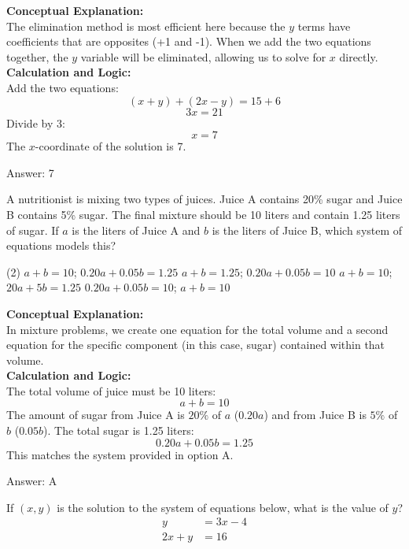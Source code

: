 \documentclass[11pt,paper=a4,answers]{exam}
\begin{document}
\begin{questions}
\begin{solution}
\textbf{Conceptual Explanation:} \\
The elimination method is most efficient here because the $y$ terms have coefficients that are opposites (+1 and -1). When we add the two equations together, the $y$ variable will be eliminated, allowing us to solve for $x$ directly.
\\[10pt]
\textbf{Calculation and Logic:} \\
Add the two equations:
\[(x + y) + (2x - y) = 15 + 6\]
\[3x = 21\]
Divide by 3:
\[x = 7\]
The $x$-coordinate of the solution is 7.

\vspace{15pt}
Answer: \colorbox{yellow!100}{7}
\end{solution}

\question
A nutritionist is mixing two types of juices. Juice A contains 20\% sugar and Juice B contains 5\% sugar. The final mixture should be 10 liters and contain 1.25 liters of sugar. If $a$ is the liters of Juice A and $b$ is the liters of Juice B, which system of equations models this?
\begin{tasks}(2)
    \task $a + b = 10$; $0.20a + 0.05b = 1.25$
    \task $a + b = 1.25$; $0.20a + 0.05b = 10$
    \task $a + b = 10$; $20a + 5b = 1.25$
    \task $0.20a + 0.05b = 10$; $a + b = 10$
\end{tasks}

\begin{solution}
\textbf{Conceptual Explanation:} \\
In mixture problems, we create one equation for the total volume and a second equation for the specific component (in this case, sugar) contained within that volume.
\\[10pt]
\textbf{Calculation and Logic:} \\
The total volume of juice must be 10 liters:
\[a + b = 10\]
The amount of sugar from Juice A is $20\%$ of $a$ ($0.20a$) and from Juice B is $5\%$ of $b$ ($0.05b$). The total sugar is 1.25 liters:
\[0.20a + 0.05b = 1.25\]
This matches the system provided in option A.

\vspace{15pt}
Answer: \colorbox{yellow!100}{A}
\end{solution}

\question
If $(x, y)$ is the solution to the system of equations below, what is the value of $y$?
\begin{align*}
y &= 3x - 4 \\
2x + y &= 16
\end{align*}


\end{questions}
\end{document}
